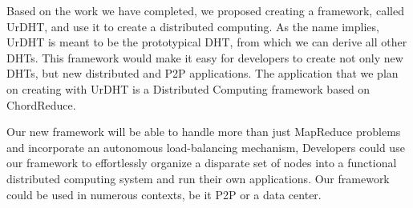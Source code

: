 Based on the work we have completed, we proposed creating a framework, called UrDHT, and use it to create a distributed computing. 
As the name implies, UrDHT is meant to be the prototypical DHT, from which we can derive all other DHTs.
This framework would make it easy for developers to create not only new DHTs, but new distributed and P2P applications.
The application that we plan on creating with UrDHT is a Distributed Computing framework based on ChordReduce.

Our new framework will be able to handle more than just MapReduce problems and incorporate an autonomous load-balancing mechanism,
Developers could use our framework to effortlessly organize a disparate set of nodes into a functional distributed computing system and run their own applications.
Our framework could be used in numerous contexts, be it P2P or a data center.